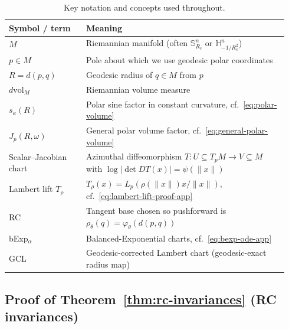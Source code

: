 \documentclass{article}
\theoremstyle{definition}
\theoremstyle{remark}
\newcommand{\SSS}{\mathbb{S}}
\newcommand{\HH}{\mathbb{H}}
\begin{document}
\begin{table}[H]
\centering
\caption{Key notation and concepts used throughout.}
\label{tab:notation}
\small
\begin{tabular}{p{0.26\linewidth}p{0.68\linewidth}}
\toprule
Symbol / term & Meaning \\
\midrule
$M$ & Riemannian manifold (often $\SSS^n_{R_c}$ or $\HH^n_{-1/R_c^2}$) \\
$p \in M$ & Pole about which we use geodesic polar coordinates \\
$R=d(p,q)$ & Geodesic radius of $q \in M$ from $p$ \\
$d\mathrm{vol}_M$ & Riemannian volume measure \\
$s_\kappa(R)$ & Polar sine factor in constant curvature, cf.\ \eqref{eq:polar-volume} \\
$J_p(R,\omega)$ & General polar volume factor, cf.\ \eqref{eq:general-polar-volume} \\
Scalar--Jacobian chart & Azimuthal diffeomorphism $T:U\subseteq T_pM\to V\subseteq M$ with $\log|\det DT(x)|=\psi(\|x\|)$ \\
Lambert lift $T_\rho$ & $T_\rho(x)=L_p(\rho(\|x\|)x/\|x\|)$, cf.\ \eqref{eq:lambert-lift-proof-app} \\
RC & Tangent base chosen so pushforward is $\rho_\theta(q)=\varphi_\theta(d(p,q))$ \\
bExp$_\alpha$ & Balanced-Exponential charts, cf.\ \eqref{eq:bexp-ode-app} \\
GCL & Geodesic-corrected Lambert chart (geodesic-exact radius map) \\
\bottomrule
\end{tabular}
\end{table}

\subsection{Proof of Theorem~\ref{thm:rc-invariances} (RC invariances)}
\label{app:proof_rc-invariances}
\end{document}
